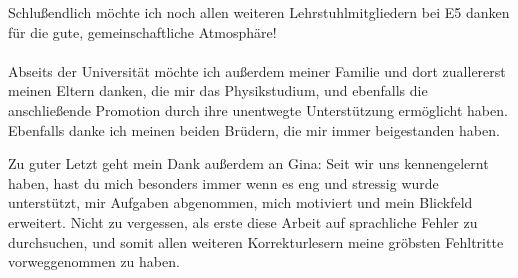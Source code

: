 Schlußendlich möchte ich noch allen weiteren Lehrstuhlmitgliedern bei E5 danken für die gute, gemeinschaftliche Atmosphäre!\\
\\
Abseits der Universität möchte ich außerdem meiner Familie und dort zuallererst meinen Eltern danken, die mir das Physikstudium, und ebenfalls die anschließende Promotion durch ihre unentwegte Unterstützung ermöglicht haben.
Ebenfalls danke ich meinen beiden Brüdern, die mir immer beigestanden haben.

Zu guter Letzt geht mein Dank außerdem an Gina: Seit wir uns kennengelernt haben, hast du mich besonders immer wenn es eng und stressig wurde unterstützt, mir Aufgaben abgenommen, mich motiviert und mein Blickfeld erweitert.
Nicht zu vergessen, als erste diese Arbeit auf sprachliche Fehler zu durchsuchen, und somit allen weiteren Korrekturlesern meine gröbsten Fehltritte vorweggenommen zu haben.


